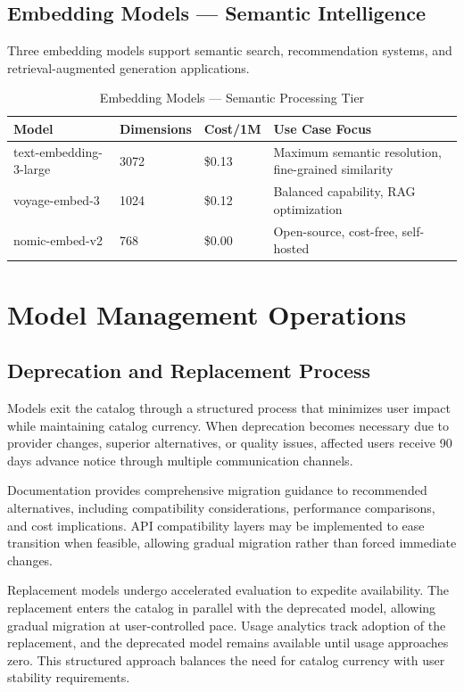 \documentclass[12pt,a4paper,twoside]{report}
\begin{document}
\subsection{Embedding Models — Semantic Intelligence}

Three embedding models support semantic search, recommendation systems, and retrieval-augmented generation applications.

\begin{table}[h]
\centering
\small
\begin{tabular}{@{}p{3.5cm}p{1.8cm}p{1.8cm}p{4.5cm}@{}}
\toprule
\textbf{Model} & \textbf{Dimensions} & \textbf{Cost/1M} & \textbf{Use Case Focus} \\
\midrule
text-embedding-3-large & 3072 & \$0.13 & Maximum semantic resolution, fine-grained similarity \\
voyage-embed-3 & 1024 & \$0.12 & Balanced capability, RAG optimization \\
nomic-embed-v2 & 768 & \$0.00 & Open-source, cost-free, self-hosted \\
\bottomrule
\end{tabular}
\caption{Embedding Models — Semantic Processing Tier}
\label{tab:embedding-models}
\end{table}

\section{Model Management Operations}

\subsection{Deprecation and Replacement Process}

Models exit the catalog through a structured process that minimizes user impact while maintaining catalog currency. When deprecation becomes necessary due to provider changes, superior alternatives, or quality issues, affected users receive 90 days advance notice through multiple communication channels.

Documentation provides comprehensive migration guidance to recommended alternatives, including compatibility considerations, performance comparisons, and cost implications. API compatibility layers may be implemented to ease transition when feasible, allowing gradual migration rather than forced immediate changes.

Replacement models undergo accelerated evaluation to expedite availability. The replacement enters the catalog in parallel with the deprecated model, allowing gradual migration at user-controlled pace. Usage analytics track adoption of the replacement, and the deprecated model remains available until usage approaches zero. This structured approach balances the need for catalog currency with user stability requirements.
\end{document}
